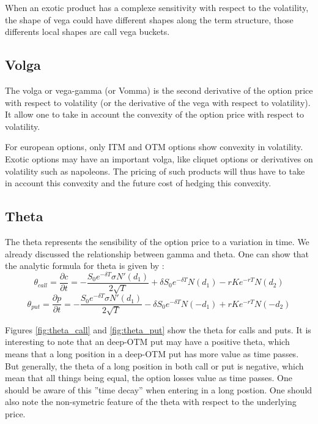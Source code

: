\documentclass[hidelinks]{article}
\begin{document}
    When an exotic product has a complexe sensitivity with respect to the volatility, the shape of vega could have different shapes along the term structure, those differents local shapes are call vega buckets.
    
    \newpage
    \subsection{Volga}
    The volga or vega-gamma (or Vomma) is the second derivative of the option price with respect to volatility (or the derivative of the vega with respect to volatility). It allow one to take in account the convexity of the option price with respect to volatility.
    
    For european options, only ITM and OTM options show convexity in volatility. Exotic options may have an important volga, like cliquet options or derivatives on volatility such as napoleons. The pricing of such products will thus have to take in account this convexity and the future cost of hedging this convexity.
    
    \newpage
    \subsection{Theta}
    
    The theta represents the sensibility of the option price to a variation in time. We already discussed the relationship between gamma and theta. One can show that the analytic formula for theta is given by :
    $$\theta_{call} = \frac{\partial c}{\partial t} = -\frac{S_0 e^{-\delta T} \sigma N'(d_1)}{2\sqrt{T}} +\delta S_0 e^{-\delta T} N(d_1) - rKe^{-rT}N(d_2)$$
    $$\theta_{put} = \frac{\partial p}{\partial t} = -\frac{S_0 e^{-\delta T} \sigma N'(d_1)}{2\sqrt{T}} -\delta S_0 e^{-\delta T} N(-d_1) + rKe^{-rT}N(-d_2)$$
    
    Figures \ref{fig:theta_call} and \ref{fig:theta_put} show the theta for calls and puts. It is interesting to note that an deep-OTM put may have a positive theta, which means that a long position in a deep-OTM put has more value as time passes. But generally, the theta of a long position in both call or put is negative, which mean that all things being equal, the option losses value as time passes. One should be aware of this ''time decay'' when entering in a long postion. One should also note the non-symetric feature of the theta with respect to the underlying price.
    
\end{document}
